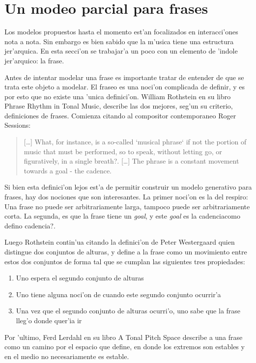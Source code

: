 \section{Un modeo parcial para frases}
Los modelos propuestos hasta el momento est'an focalizados en interacci'ones nota a nota. Sin embargo es bien sabido que la m'usica
tiene una estructura jer'arquica. En esta secci'on se trabajar'a un poco con un elemento de 'indole jer'arquico: la frase. 

Antes de intentar modelar una frase es importante tratar de entender de que se trata este objeto a modelar. El fraseo es una
noci'on complicada de definir, y es por esto que no existe una 'unica definici'on. William Rothstein en su libro Phrase Rhythm 
in Tonal Music, describe las dos mejores, seg'un su criterio, definiciones de frases. Comienza citando al compositor contemporaneo
Roger Sessions: 

\begin{quote} 
[\ldots] What, for instance, is a so-called `musical phrase` if not the portion of music that must be performed, so to speak, 
without letting go, or figuratively, in a single breath?. [\ldots] The phrase is a constant movement towards a goal - the cadence.
\end{quote}

Si bien esta definici'on lejos est'a de permitir construir un modelo generativo para frases, hay dos nociones que son interesantes. 
La primer noci'on es la del respiro: Una frase no puede ser arbitrariamente larga, tampoco puede ser arbitrariamente corta. La 
segunda, es que la frase tiene un \emph{goal}, y este \emph{goal} es la cadencia\alert{como defino cadencia?}. 

Luego Rothstein contin'ua citando la definici'on de Peter Westergaard quien distingue dos conjuntos de alturas, y define
a la frase como un movimiento entre estos dos conjuntos de forma tal que se cumplan las siguientes tres propiedades:
\begin{enumerate}
 \item Uno espera el segundo conjunto de alturas
 \item Uno tiene alguna noci'on de cuando este segundo conjunto ocurrir'a
 \item Una vez que el segundo conjunto de alturas ocurri'o, uno sabe que la frase lleg'o donde quer'ia ir
\end{enumerate}


Por 'ultimo, Ferd Lerdahl en su libro A Tonal Pitch Space describe a una frase como un camino por el espacio que define, en donde 
los extremos son estables y en el medio no necesariamente es estable. 

